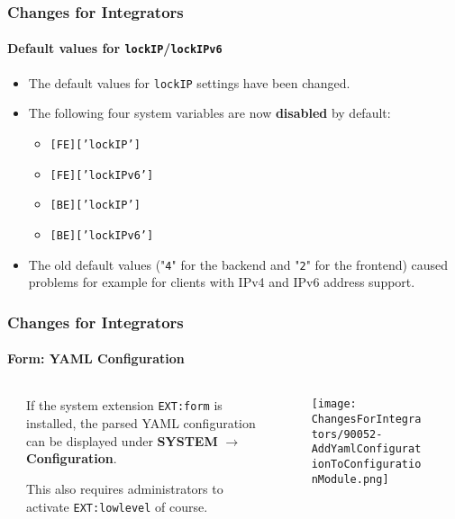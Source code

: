 \begin{frame}[fragile]
	\frametitle{Changes for Integrators}
	\framesubtitle{Default values for \texttt{lockIP}/\texttt{lockIPv6}}

	\lstset{basicstyle=\smaller\ttfamily}

	\begin{itemize}
		\item The default values for \texttt{lockIP} settings have been changed.
		\item The following four system variables are now \textbf{disabled} by default:

			\begin{itemize}
				\item \texttt{[FE]['lockIP']}
				\item \texttt{[FE]['lockIPv6']}
				\item \texttt{[BE]['lockIP']}
				\item \texttt{[BE]['lockIPv6']}
			\end{itemize}

		\item The old default values ("\texttt{4}" for the backend and "\texttt{2}" for the frontend)
			caused problems for example for clients with IPv4 and IPv6 address support.

	\end{itemize}

\end{frame}


\begin{frame}[fragile]
	\frametitle{Changes for Integrators}
	\framesubtitle{Form: YAML Configuration}

	\begin{columns}[T]
		\begin{column}{.04\textwidth}
		\end{column}
		\begin{column}{.38\textwidth}

			If the system extension \texttt{EXT:form} is installed, the parsed YAML configuration
			can be displayed under \textbf{SYSTEM} $\rightarrow$ \textbf{Configuration}.

			\vspace{0.2cm}

			This also requires administrators to activate \texttt{EXT:lowlevel} of course.

		\end{column}
		\begin{column}{.58\textwidth}
			\vspace{-0.3cm}
			\begin{figure}
				\texttt{[image: ChangesForIntegrators/90052-AddYamlConfigurationToConfigurationModule.png]}
			\end{figure}
		\end{column}
	\end{columns}

\end{frame}

